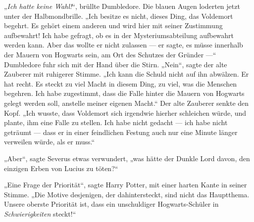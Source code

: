 „\emph{Ich hatte keine Wahl!}“, brüllte Dumbledore. Die blauen Augen loderten jetzt unter der Halbmondbrille.
„Ich besitze es nicht, dieses Ding, das Voldemort begehrt. Es gehört einem anderen und wird hier mit seiner Zustimmung aufbewahrt! Ich habe gefragt, ob es in der Mysteriumsabteilung aufbewahrt werden kann. Aber das wollte er nicht zulassen — er sagte, es müsse innerhalb der Mauern von Hogwarts sein, am Ort des Schutzes der Gründer —“ Dumbledore fuhr sich mit der Hand über die Stirn.
„Nein“, sagte der alte Zauberer mit ruhigerer Stimme.
„Ich kann die Schuld nicht auf ihn abwälzen. Er hat recht. Es steckt zu viel Macht in diesem Ding, zu viel, was die Menschen begehren. Ich habe zugestimmt, dass die Falle hinter die Mauern von Hogwarts gelegt werden soll, anstelle meiner eigenen Macht.“ Der alte Zauberer senkte den Kopf.
„Ich wusste, dass Voldemort sich irgendwie hierher schleichen würde, und plante, ihm eine Falle zu stellen. Ich habe nicht gedacht — ich habe nicht geträumt — dass er in einer feindlichen Festung auch nur eine Minute länger verweilen würde, als er muss.“

„Aber“, sagte Severus etwas verwundert, „was hätte der Dunkle Lord davon, den einzigen Erben von Lucius zu töten?“

„Eine Frage der Priorität“, sagte Harry Potter, mit einer harten Kante in seiner Stimme.
„Die Motive desjenigen, der dahintersteckt, sind nicht das Hauptthema. Unsere oberste Priorität ist, dass ein unschuldiger Hogwarts-Schüler in \emph{Schwierigkeiten} steckt!“


